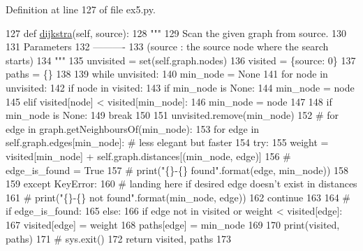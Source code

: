 Definition at line 127 of file ex5.\+py.


\begin{DoxyCode}
127     \textcolor{keyword}{def }\hyperlink{classex5_1_1Dijsktra_aee756193b4ffa1f19d0d815c382e9f5c}{dijkstra}(self, source):
128         \textcolor{stringliteral}{"""}
129 \textcolor{stringliteral}{        Scan the given graph from source.}
130 \textcolor{stringliteral}{}
131 \textcolor{stringliteral}{        Parameters}
132 \textcolor{stringliteral}{        ----------}
133 \textcolor{stringliteral}{        (source : the source node where the search starts)}
134 \textcolor{stringliteral}{        """}
135         unvisited = set(self.graph.nodes)
136         visited = \{source: 0\}
137         paths = \{\}
138 
139         \textcolor{keywordflow}{while} unvisited:
140             min\_node = \textcolor{keywordtype}{None}
141             \textcolor{keywordflow}{for} node \textcolor{keywordflow}{in} unvisited:
142                 \textcolor{keywordflow}{if} node \textcolor{keywordflow}{in} visited:
143                     \textcolor{keywordflow}{if} min\_node \textcolor{keywordflow}{is} \textcolor{keywordtype}{None}:
144                         min\_node = node
145                     \textcolor{keywordflow}{elif} visited[node] < visited[min\_node]:
146                         min\_node = node
147 
148             \textcolor{keywordflow}{if} min\_node \textcolor{keywordflow}{is} \textcolor{keywordtype}{None}:
149                 \textcolor{keywordflow}{break}
150 
151             unvisited.remove(min\_node)
152             \textcolor{comment}{# for edge in graph.getNeighboursOf(min\_node):}
153             \textcolor{keywordflow}{for} edge \textcolor{keywordflow}{in} self.graph.edges[min\_node]:  \textcolor{comment}{# less elegant but faster}
154                 \textcolor{keywordflow}{try}:
155                     weight = visited[min\_node] + self.graph.distances[(min\_node, edge)]
156                     \textcolor{comment}{# edge\_is\_found = True}
157                     \textcolor{comment}{# print("\{\}-\{\} found".format(edge, min\_node))}
158 
159                 \textcolor{keywordflow}{except} KeyError:
160                     \textcolor{comment}{# landing here if desired edge doesn't exist in distances}
161                     \textcolor{comment}{# print("\{\}-\{\} not found".format(min\_node, edge))}
162                     \textcolor{keywordflow}{continue}
163 
164                 \textcolor{comment}{# if edge\_is\_found:}
165                 \textcolor{keywordflow}{else}:
166                     \textcolor{keywordflow}{if} edge \textcolor{keywordflow}{not} \textcolor{keywordflow}{in} visited \textcolor{keywordflow}{or} weight < visited[edge]:
167                         visited[edge] = weight
168                         paths[edge] = min\_node
169 
170         print(visited, paths)
171         \textcolor{comment}{# sys.exit()}
172         \textcolor{keywordflow}{return} visited, paths
173 
\end{DoxyCode}
